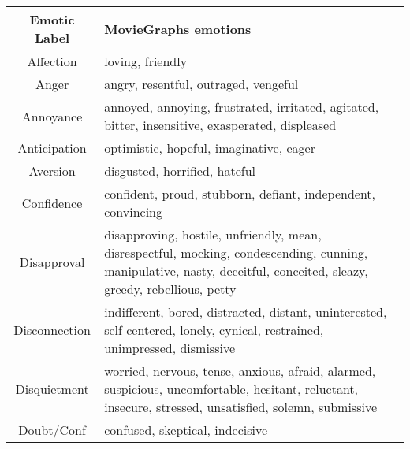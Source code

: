 \begin{table}[t]
\centering
\footnotesize
\tabcolsep=0.05cm
\begin{tabular}{cp{6.2cm}}
\toprule
Emotic Label  & MovieGraphs emotions                                                                                                                                                  \\ \midrule
Affection     & loving, friendly                                                                                                                                                      \\
Anger         & angry, resentful, outraged, vengeful                                                                                                                                  \\
Annoyance     & annoyed, annoying, frustrated, irritated, agitated, bitter, insensitive, exasperated, displeased                                                                      \\
Anticipation  & optimistic, hopeful, imaginative, eager                                                                                                                               \\
Aversion      & disgusted, horrified, hateful                                                                                                                                         \\
Confidence    & confident, proud, stubborn, defiant, independent, convincing                                                                                                          \\
Disapproval   & disapproving, hostile, unfriendly, mean, disrespectful, mocking, condescending, cunning, manipulative, nasty, deceitful, conceited, sleazy, greedy, rebellious, petty \\
Disconnection & indifferent, bored, distracted, distant, uninterested, self-centered, lonely, cynical, restrained, unimpressed, dismissive                                            \\
Disquietment  & worried, nervous, tense, anxious, afraid, alarmed, suspicious, uncomfortable, hesitant, reluctant, insecure, stressed, unsatisfied, solemn, submissive                \\
Doubt/Conf    & confused, skeptical, indecisive                                                                                                                                       \\

\end{tabular}
\end{table}
